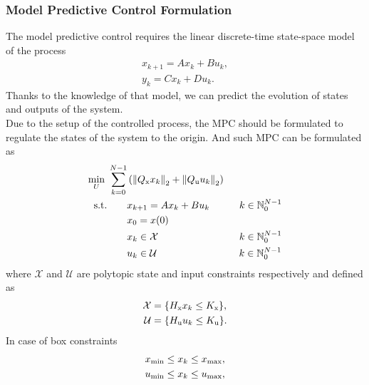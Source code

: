 \subsubsection{Model Predictive Control Formulation}
The model predictive control requires the linear discrete-time state-space model of the process
\begin{subequations}\label{linmodel}
	\begin{align}	
	x_{k+1} = Ax_k + Bu_k,\\
	y_k = Cx_k + Du_k.
	\end{align}
\end{subequations}
Thanks to the knowledge of that model, we can predict the evolution of states and outputs of the system.\\
Due to the setup of the controlled process, the MPC should be formulated to regulate the states of the system to the origin. And such MPC can be formulated as
\begin{subequations}\label{mpcgeneral}
	\begin{align}
		\min_{U}\ \sum_{k=0}^{N-1}& \left( \left\| Q _{\text{x}}x_{k}\right\|_2+\left\|Q _{\text{u}}u_{k}\right\|_2 \right)\\
	    \label{eq217b}\text{s.t.}\qquad&x_{k+1} = Ax_{k} + Bu_{k}\qquad\quad  k \in \mathbb{N}_0^{N-1}\\
		&x_0 = x(0)\\
		\label{cst_x}&x_{k}\in\mathcal{X}\qquad\qquad\qquad\qquad\,  k \in \mathbb{N}_0^{N-1}\\
		\label{cst_u}&u_{k}\in\mathcal{U}\qquad\qquad\qquad\qquad\;   k \in \mathbb{N}_0^{N-1}
	\end{align}
\end{subequations}
where $\mathcal{X}$ and $\mathcal{U}$ are polytopic state and input constraints respectively and defined as
\begin{subequations}
	\begin{align}
	\mathcal{X} &= \{H _{\text{x}}x_k\leq K _{\text{x}}\},\\
	\mathcal{U} &= \{H _{\text{u}}u_k\leq K _{\text{u}}\}.
	\end{align}
\end{subequations}
In case of box constraints
\begin{subequations}
	\begin{align}
		x _{\text{min}}\leq x_k \leq x _{\text{max}},\\
		u _{\text{min}}\leq x_k \leq u _{\text{max}},\\
	\end{align}
\end{subequations}
